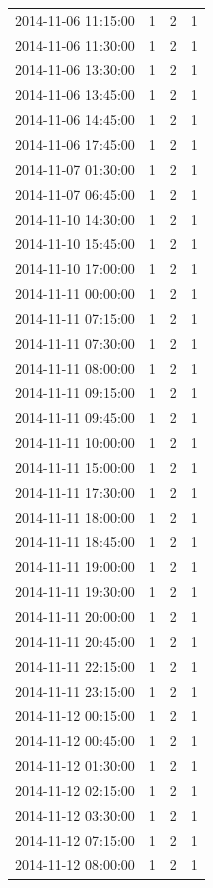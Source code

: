 \begin{tabular}{lrrr}
2014-11-06 11:15:00 & 1 & 2 & 1 \\
2014-11-06 11:30:00 & 1 & 2 & 1 \\
2014-11-06 13:30:00 & 1 & 2 & 1 \\
2014-11-06 13:45:00 & 1 & 2 & 1 \\
2014-11-06 14:45:00 & 1 & 2 & 1 \\
2014-11-06 17:45:00 & 1 & 2 & 1 \\
2014-11-07 01:30:00 & 1 & 2 & 1 \\
2014-11-07 06:45:00 & 1 & 2 & 1 \\
2014-11-10 14:30:00 & 1 & 2 & 1 \\
2014-11-10 15:45:00 & 1 & 2 & 1 \\
2014-11-10 17:00:00 & 1 & 2 & 1 \\
2014-11-11 00:00:00 & 1 & 2 & 1 \\
2014-11-11 07:15:00 & 1 & 2 & 1 \\
2014-11-11 07:30:00 & 1 & 2 & 1 \\
2014-11-11 08:00:00 & 1 & 2 & 1 \\
2014-11-11 09:15:00 & 1 & 2 & 1 \\
2014-11-11 09:45:00 & 1 & 2 & 1 \\
2014-11-11 10:00:00 & 1 & 2 & 1 \\
2014-11-11 15:00:00 & 1 & 2 & 1 \\
2014-11-11 17:30:00 & 1 & 2 & 1 \\
2014-11-11 18:00:00 & 1 & 2 & 1 \\
2014-11-11 18:45:00 & 1 & 2 & 1 \\
2014-11-11 19:00:00 & 1 & 2 & 1 \\
2014-11-11 19:30:00 & 1 & 2 & 1 \\
2014-11-11 20:00:00 & 1 & 2 & 1 \\
2014-11-11 20:45:00 & 1 & 2 & 1 \\
2014-11-11 22:15:00 & 1 & 2 & 1 \\
2014-11-11 23:15:00 & 1 & 2 & 1 \\
2014-11-12 00:15:00 & 1 & 2 & 1 \\
2014-11-12 00:45:00 & 1 & 2 & 1 \\
2014-11-12 01:30:00 & 1 & 2 & 1 \\
2014-11-12 02:15:00 & 1 & 2 & 1 \\
2014-11-12 03:30:00 & 1 & 2 & 1 \\
2014-11-12 07:15:00 & 1 & 2 & 1 \\
2014-11-12 08:00:00 & 1 & 2 & 1 \\

\end{tabular}
